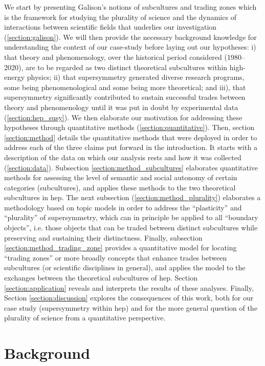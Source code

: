 \documentclass[smallextended]{svjour3}
\begin{document}
We start by presenting Galison's notions of subcultures and trading zones which is the framework for studying the plurality of science and the dynamics of interactions between scientific fields that underlies our investigation 
(\ref{section:galison}). We will then provide the necessary background knowledge for understanding the context of our case-study before laying out our hypotheses: i) that theory and phenomenology, over the historical period considered (1980--2020), are to be regarded as two distinct theoretical subcultures within high-energy physics; ii) that supersymmetry generated diverse research programs, some being phenomenological and some being more theoretical; and iii), that supersymmetry significantly contributed to sustain successful trades between theory and phenomenology until it was put in doubt by experimental data (\ref{section:hep_susy}). We then elaborate our motivation for addressing these hypotheses through quantitative methods (\ref{section:quantitative}). Then, section \ref{section:method} details the quantitative methods that were deployed in order to address each of the three claims put forward in the introduction. It starts with a description of the data on which our analysis rests and how it was collected (\ref{section:data}). Subsection \ref{section:method_subcultures} elaborates quantitative methods for assessing the level of semantic and social autonomy of certain categories (subcultures), and applies these methods to the two theoretical subcultures in \gls{hep}. The next subsection (\ref{section:method_plurality}) elaborates a methodology based on topic models in order to address the ``plasticity'' and ``plurality'' of supersymmetry, which can in principle be applied to all ``boundary objects'', i.e. those objects that can be traded between distinct subcultures while preserving and sustaining their distinctness. Finally, subsection \ref{section:method_trading_zone} provides a quantitative model for locating ``trading zones'' or more broadly concepts that enhance trades between subcultures (or scientific disciplines in general), and applies the model to the exchanges between the theoretical subcultures of \gls{hep}. Section \ref{section:application} reveals and interprets the results of these analyses. Finally, Section \ref{section:discussion} explores the consequences of this work, both for our case study (supersymmetry within \gls{hep}) and for the more general question of the plurality of science from a quantitative perspective.

\section{\label{section:background}Background}
\end{document}
